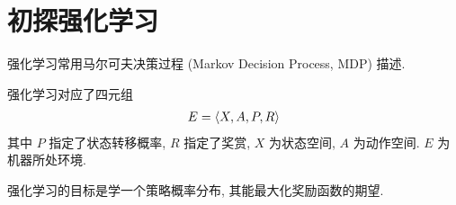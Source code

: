 \newpage
\section{初探强化学习}


强化学习常用马尔可夫决策过程 (Markov Decision Process, MDP) 描述. 

强化学习对应了四元组
\begin{align*}
    E=\braket{X, A, P, R}
\end{align*}
其中 $P$ 指定了状态转移概率, $R$ 指定了奖赏, $X$ 为状态空间, $A$ 为动作空间. $E$ 为机器所处环境. 

强化学习的目标是学一个策略概率分布, 其能最大化奖励函数的期望.
